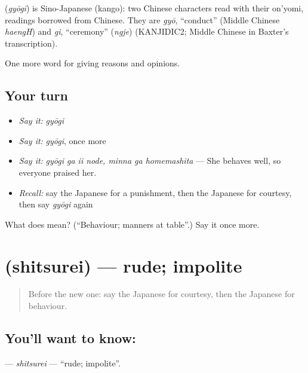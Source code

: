 \begin{cousinweb}
\textbf{} (\emph{gyōgi}) is Sino-Japanese (kango): two Chinese characters read with their on'yomi, readings borrowed from Chinese. They are \emph{gyō}, \textquotedblleft{}conduct\textquotedblright{} (Middle Chinese \emph{haengH}) and \emph{gi}, \textquotedblleft{}ceremony\textquotedblright{} (\emph{ngje}) (KANJIDIC2; Middle Chinese in Baxter's transcription).
\end{cousinweb}

\begin{grammarlens}[title={What you've built}]
One more word for giving reasons and opinions.
\end{grammarlens}

\subsection*{Your turn}
\begin{itemize}
\raggedright
  \item \emph{Say it:} \emph{gyōgi}
  \item \emph{Say it:} \emph{gyōgi}, once more
  \item \emph{Say it:} \emph{gyōgi ga ii node, minna ga homemashita} — She behaves well, so everyone praised her.
  \item \emph{Recall:} say the Japanese for a punishment, then the Japanese for courtesy, then say \emph{gyōgi} again
\end{itemize}

\begin{tcolorbox}[breakable,colback=teal!4,colframe=teal!35!black,title={Before you move on}]
What does  mean? (\textquotedblleft{}Behaviour; manners at table\textquotedblright{}.) Say it once more.
\end{tcolorbox}
\section[\texorpdfstring{\ja{しつれい} (shitsurei)}{しつれい (shitsurei)}]{ (shitsurei) — rude; impolite}

\label{lesson:JA-C327-shitsurei}



\begin{quote}
Before the new one: say the Japanese for courtesy, then the Japanese for behaviour.
\end{quote}

\subsection*{You'll want to know: }
\textbf{} — \emph{shitsurei} — \textquotedblleft{}rude; impolite\textquotedblright{}.

